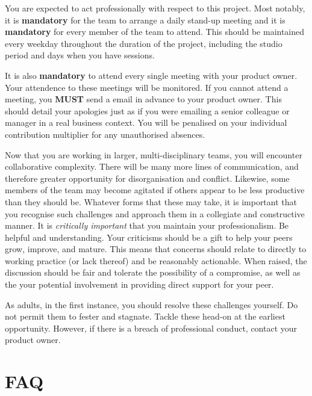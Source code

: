 \documentclass{../../fal_assignment}
\begin{document}
You are expected to act professionally with respect to this project. Most notably, it is \textbf{mandatory} for the team to arrange a daily stand-up meeting and it is \textbf{mandatory} for every member of the team to attend. This should be maintained every weekday throughout the duration of the project, including the studio period and days when you have sessions. 

It is also \textbf{mandatory} to attend every single meeting with your product owner. Your attendence to these meetings will be monitored. If you cannot attend a meeting, you \textbf{MUST} send a email in advance to your product owner. This should detail your apologies just as if you were emailing a senior colleague or manager in a real business context. You will be penalised on your individual contribution multiplier for any unauthorised absences. 

Now that you are working in larger, multi-disciplinary teams, you will encounter collaborative complexity. There will be many more lines of communication, and therefore greater opportunity for disorganisation and conflict. Likewise, some members of the team may become agitated if others appear to be less productive than they should be. Whatever forms that these may take, it is important that you recognise such challenges and approach them in a collegiate and constructive manner. It is \textit{critically important} that you maintain your professionalism. Be helpful and understanding. Your criticisms should be a gift to help your peers grow, improve, and mature. This means that concerns should relate to directly to working practice (or lack thereof) and be reasonably actionable. When raised, the discussion should be fair and tolerate the possibility of a compromise, as well as the your potential involvement in providing direct support for your peer.    

As adults, in the first instance, you should resolve these challenges yourself. Do not permit them to fester and stagnate. Tackle these head-on at the earliest opportunity. However, if there is a breach of professional conduct, contact your product owner. 

\section*{FAQ}
\end{document}
